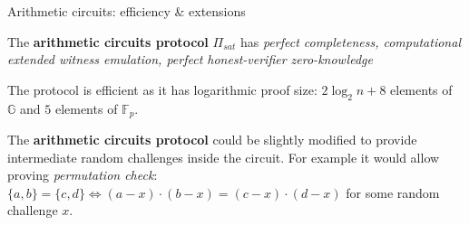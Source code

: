 \documentclass{zkdl-presentation-template}
\begin{document}
    \begin{frame}{Arithmetic circuits: efficiency \& extensions}
        \begin{theorem}
            The \textbf{arithmetic circuits protocol} $\Pi_{sat}$ has \textit{perfect completeness, computational extended witness emulation, perfect honest-verifier zero-knowledge}
        \end{theorem}
        \pause
        The protocol is efficient as it has logarithmic proof size: $2\log_2 n + 8$ elements of $\mathbb{G}$ and $5$ elements of $\mathbb{F}_p$.
        \pause
        \begin{remark}
            The \textbf{arithmetic circuits protocol} could be slightly modified to provide intermediate random challenges inside the circuit. For example it would allow proving \textit{permutation check}: $\{a,b\} = \{c,d\}  \iff (a-x)\cdot(b-x) = (c-x)\cdot(d-x)$ for some random challenge $x$.
        \end{remark}
    \end{frame}

    \makeclosingframe
\end{document}
